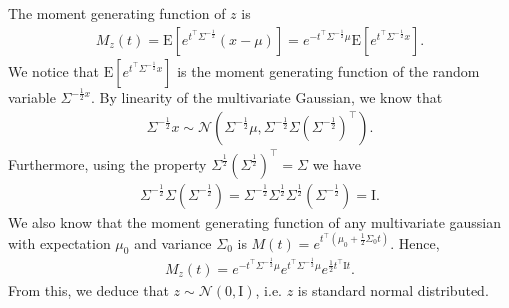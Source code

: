 \documentclass[]{article}
\begin{document}
\subsection{}
The moment generating function of $z$ is
\begin{equation}\begin{aligned}
M_z(t)
= \text{E}[e^{t^\top \Sigma^{-\frac{1}{2}}}(x-\mu)]
= e^{-t ^\top \Sigma^{-\frac{1}{2}}\mu}\text{E}[e^{t^\top \Sigma^{-\frac{1}{2}}x}].
\end{aligned}\end{equation}
We notice that $\text{E}[e^{t^\top \Sigma^{-\frac{1}{2}}x}]$ is the moment generating function of the random variable $\Sigma^{-\frac{1}{2}x}$. By linearity of the multivariate Gaussian, we know that
\begin{equation}\begin{aligned}
\Sigma^{-\frac{1}{2}}x \sim \mathcal{N}(
\Sigma^{-\frac{1}{2}}\mu,
\Sigma^{-\frac{1}{2}}\Sigma(\Sigma^{-\frac{1}{2}})^\top).
\end{aligned}\end{equation}
Furthermore, using the property $\Sigma^{\frac{1}{2}}(\Sigma^{\frac{1}{2}})^{\top} = \Sigma$ we have
\begin{equation}\begin{aligned}
\Sigma^{-\frac{1}{2}}\Sigma(\Sigma^{-\frac{1}{2}})
= \Sigma^{-\frac{1}{2}}\Sigma^{\frac{1}{2}}\Sigma^{\frac{1}{2}}(\Sigma^{-\frac{1}{2}})
= \text{I}.
\end{aligned}\end{equation}
We also know that the moment generating function of any multivariate gaussian with expectation $\mu_0$ and variance $\Sigma_0$ is $M(t) = e^{t^\top(\mu_0 + \frac{1}{2}\Sigma_0 t)}$. Hence,
\begin{equation}\begin{aligned}
M_z(t) =
e^{-t^\top \Sigma^{-\frac{1}{2}}\mu}
e^{t^\top \Sigma^{-\frac{1}{2}}\mu}
e^{\frac{1}{2}t^\top\text{I}t}.
\end{aligned}\end{equation}
From this, we deduce that $z \sim \mathcal{N}(0, \text{I})$, i.e. $z$ is standard normal distributed.
\end{document}

